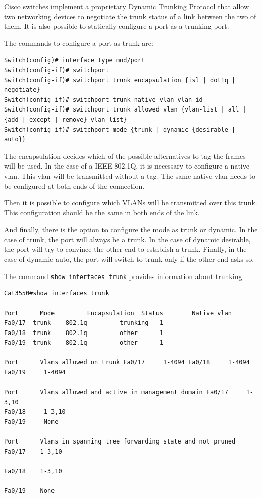 Cisco switches implement a proprietary Dynamic Trunking Protocol that allow two networking devices to negotiate the trunk status of a link between the two of them.
It is also possible to statically configure a port as a trunking port.

The commands to configure a port as trunk are:

\begin{lstlisting}
Switch(config)# interface type mod/port
Switch(config-if)# switchport
Switch(config-if)# switchport trunk encapsulation {isl | dot1q | negotiate}
Switch(config-if)# switchport trunk native vlan vlan-id
Switch(config-if)# switchport trunk allowed vlan {vlan-list | all |
{add | except | remove} vlan-list}
Switch(config-if)# switchport mode {trunk | dynamic {desirable | auto}}
\end{lstlisting}

The encapsulation decides which of the possible alternatives to tag the frames will be used.
In the case of a IEEE 802.1Q, it is necessary to configure a native vlan.
This vlan will be transmitted without a tag.
The same native vlan needs to be configured at both ends of the connection.

Then it is possible to configure which VLANs will be transmitted over this trunk.
This configuration should be the same in both ends of the link.

And finally, there is the option to configure the mode as trunk or dynamic.
In the case of trunk, the port will always be a trunk.
In the case of dynamic desirable, the port will try to convince the other end to establish a trunk.
Finally, in the case of dynamic auto, the port will switch to trunk only if the other end asks so.

The command \texttt{show interfaces trunk} provides information about trunking.
\begin{lstlisting}
Cat3550#show interfaces trunk

Port      Mode         Encapsulation  Status        Native vlan
Fa0/17  trunk    802.1q         trunking   1
Fa0/18  trunk    802.1q         other      1
Fa0/19  trunk    802.1q         other      1

Port      Vlans allowed on trunk Fa0/17     1-4094 Fa0/18     1-4094
Fa0/19     1-4094

Port      Vlans allowed and active in management domain Fa0/17     1-3,10
Fa0/18     1-3,10
Fa0/19     None

Port      Vlans in spanning tree forwarding state and not pruned
Fa0/17    1-3,10

Fa0/18    1-3,10

Fa0/19    None
\end{lstlisting}

